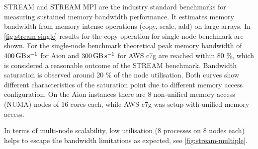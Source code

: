 STREAM and STREAM MPI \cite{McCalpin1995,McCalpin2007} are the industry
standard benchmarks for measuring sustained memory bandwidth performance. It
estimates memory bandwidth from memory intense operations (copy, scale, add) on
large arrays. In \autoref{fig:stream-single} results for the copy operation for
single-node benchmark are shown. For the single-node benchmark theoretical peak
memory bandwidth of $\SI{400}{\giga\byte\per\second}$ for Aion and
$\SI{300}{\giga\byte\per\second}$ for AWS c7g are reached within 80 \%, which
is considered a reasonable outcome of the STREAM benchmark. Bandwidth
saturation is observed around 20 \% of the node utilisation. Both curves show
different characteristics of the saturation point due to different memory
access configuration. On the Aion instances there are 8 non-unified memory
access (NUMA) nodes of 16 cores each, while AWS c7g was setup with unified
memory access.

In terms of multi-node scalability, low utilisation (8 processes on 8 nodes
each) helps to escape the bandwidth limitations as expected, see
\autoref{fig:stream-multiple}.

